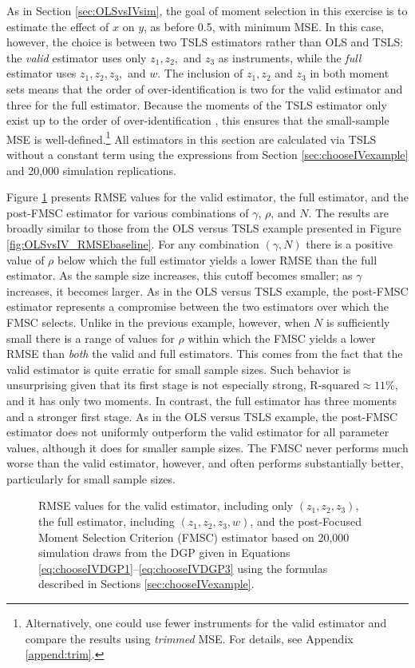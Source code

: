 As in Section \ref{sec:OLSvsIVsim}, the goal of moment selection in this exercise is to estimate the effect of $x$ on $y$, as before 0.5, with minimum MSE.
In this case, however, the choice is between two TSLS estimators rather than OLS and TSLS: the \emph{valid} estimator uses only $z_1, z_2,$ and $z_3$ as instruments, while the \emph{full} estimator uses $z_1, z_2, z_3,$ and $w$.
The inclusion of $z_1, z_2$ and $z_3$ in both moment sets means that the order of over-identification is two for the valid estimator and three for the full estimator. 
Because the moments of the TSLS estimator only exist up to the order of over-identification \citep{Phillips1980}, this ensures that the small-sample MSE is well-defined.\footnote{Alternatively, one could use fewer instruments for the valid estimator and compare the results using \emph{trimmed} MSE. For details, see Appendix \ref{append:trim}.}
All estimators in this section are calculated via TSLS without a constant term using the expressions from Section \ref{sec:chooseIVexample} and 20,000 simulation replications.
 
Figure \ref{fig:chooseIVsim_RMSEbaseline} presents RMSE values for the valid estimator, the full estimator, and the post-FMSC estimator for various combinations of $\gamma$, $\rho$, and $N$.
The results are broadly similar to those from the OLS versus TSLS example presented in Figure \ref{fig:OLSvsIV_RMSEbaseline}.
For any combination $(\gamma,N)$ there is a positive value of $\rho$ below which the full estimator yields a lower RMSE than the full estimator.
As the sample size increases, this cutoff becomes smaller; as $\gamma$ increases, it becomes larger.
As in the OLS versus TSLS example, the post-FMSC estimator represents a compromise between the two estimators over which the FMSC selects.
Unlike in the previous example, however, when $N$ is sufficiently small there is a range of values for $\rho$ within which the FMSC yields a lower RMSE than \emph{both} the valid and full estimators.
This comes from the fact that the valid estimator is quite erratic for small sample sizes.
Such behavior is unsurprising given that its first stage is not especially strong, $\mbox{R-squared}\approx 11\%$, and it has only two moments.
In contrast, the full estimator has three moments and a stronger first stage.
As in the OLS versus TSLS example, the post-FMSC estimator does not uniformly outperform the valid estimator for all parameter values, although it does for smaller sample sizes.
The FMSC never performs much worse than the valid estimator, however, and often performs substantially better, particularly for small sample sizes.
\begin{figure}
\centering
	
	\caption{RMSE values for the valid estimator, including only $(z_1, z_2, z_3)$, the full estimator, including $(z_1, z_2, z_3, w)$, and the post-Focused Moment Selection Criterion (FMSC) estimator based on 20,000 simulation draws from the DGP given in Equations \ref{eq:chooseIVDGP1}--\ref{eq:chooseIVDGP3} using the formulas described in Sections \ref{sec:chooseIVexample}.}
	\label{fig:chooseIVsim_RMSEbaseline}
\end{figure}

